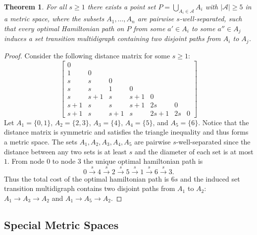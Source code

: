 \documentclass{article}
\newtheorem{thm}{Theorem}[section]
\theoremstyle{definition}
\newcommand{\ACollection}{\mathcal{A}}
\begin{document}
\begin{thm}
    For all $s \geq 1$ there exists a point set $P = \bigcup_{A_i \in \ACollection} A_i$ with $|\ACollection| \geq 5$ in a metric space, where the subsets $A_1, \ldots, A_n$ are pairwise $s$-well-separated, such that every optimal Hamiltonian path on $P$ from some $a' \in A_i$ to some $a'' \in A_j$ induces a set transition multidigraph containing two disjoint paths from $A_i$ to $A_j$.
\end{thm}
\begin{proof}
    Consider the following distance matrix for some $s \geq 1$:
    $$\begin{bmatrix}
        0 & & & & & & \\
        1 & 0 & & & & & \\
        s & s & 0 & & & & \\
        s & s & 1 & 0 & & & \\
        s & s + 1 & s & s + 1 & 0 & & \\
        s + 1 & s & s & s + 1 & 2s & 0 & \\
        s + 1 & s & s + 1 & s & 2s + 1 & 2s & 0
    \end{bmatrix}$$
    Let $A_1 = \{0, 1\}$, $A_2 = \{2, 3\}$, $A_3 = \{4\}$, $A_4 = \{5\}$, and $A_5 = \{6\}$.
    Notice that the distance matrix is symmetric and satisfies the triangle inequality and thus forms a metric space.
    The sets $A_1, A_2, A_3, A_4, A_5$ are pairwise $s$-well-separated since the distance between any two sets is at least $s$ and the diameter of each set is at most $1$.
    From node $0$ to node $3$ the unique optimal hamiltonian path is
    $$0 \xrightarrow{\; s \;} 4 \xrightarrow{\; s \;} 2 \xrightarrow{\; s \;} 5 \xrightarrow{\; s \;} 1 \xrightarrow{\; s \;} 6 \xrightarrow{\; s \;} 3.$$
    Thus the total cost of the optimal hamiltonian path is $6s$ and the induced set transition multidigraph contains two disjoint paths from $A_1$ to $A_2$: $A_1 \to A_3 \to A_2$ and $A_1 \to A_5 \to A_2$.
\end{proof}

\subsection{Special Metric Spaces}
\end{document}
